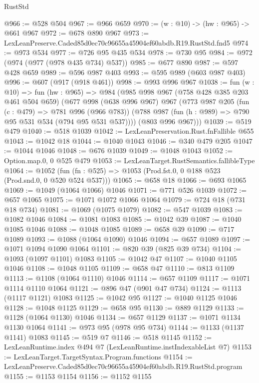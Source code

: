 \begin{lexlean}{RustStd}
\begin{coremodule}
@966 := @528 @504
@967 := @966 @659
@970 := (w : @10) -> (hw : @965) -> @661 @967
@972 := @678 @890 @967
@973 := LexLeanPreserve.Caded85d0ec70c96655a45904ef60abdb.R19.RustStd.fnd5
@974 := @973 @534
@977 := @726 @95 @435 @534
@978 := @730 @95
@984 := @972 (@974 (@977 (@978 @435 @734) @537))
@985 := @677 @890
@987 := @597 @428 @659
@989 := @596 @987 @403
@993 := @595 @989 (@603 @987 @403)
@996 := @607 (@917 (@918 @461))
@998 := @993 @996 @967
@1038 := fun (w : @10) =>
  fun (hw : @965) =>
  @984
    (@985
      @998
      @967
      (@758 @428 @385 @203 @461 @504 @659)
      (@677
        @998
        (@638 @996 @967)
        @967
        (@773
          @987
          @205
          (fun (c : @479) => @781 @996 (@966 @783))
          (@788 @987 (fun (h : @989) => @790 @95 @531 @534 (@794 @95 @531 @537))))
        (@803 @996 @967)))
@1039 := @519 @479
@1040 := @518 @1039
@1042 := LexLeanPreservation.Rust.fnFallible @655
@1043 := @1042 @18
@1044 := @1040 @1043
@1046 := @340 @479 @205
@1047 := @1044 @1046
@1048 := @676 @1039
@1049 := @1048 @1043
@1052 := Option.map.{0, 0} @525 @479
@1053 := LexLeanTarget.RustSemantics.fallibleType
@1064 := @1052
    (fun (fn : @525) => @1053 (Prod.fst.{0, 0} @188 @523 (Prod.snd.{0, 0} @520 @524 @537)))
@1065 := @658 @18
@1066 := @693 @1065
@1069 := @1049 (@1064 @1066) @1046
@1071 := @771 @526 @1039
@1072 := @657 @1065
@1075 := @1071 @1072 @1066 @1064
@1079 := @724 @18 (@731 @18 @734)
@1081 := @1069 (@1075 @1079)
@1082 := @547 @1039
@1083 := @1082 @1046
@1084 := @1081 @1083
@1085 := @1042 @39
@1087 := @1040 @1085 @1046
@1088 := @1048 @1085
@1089 := @658 @39
@1090 := @717 @1089
@1093 := @1088 (@1064 @1090) @1046
@1094 := @657 @1089
@1097 := @1071 @1094 @1090 @1064
@1101 := @820 @39 (@825 @39 @734)
@1104 := @1093 (@1097 @1101) @1083
@1105 := @1042 @47
@1107 := @1040 @1105 @1046
@1108 := @1048 @1105
@1109 := @658 @47
@1110 := @813 @1109
@1113 := @1108 (@1064 @1110) @1046
@1114 := @657 @1109
@1117 := @1071 @1114 @1110 @1064
@1121 := @896 @47 (@901 @47 @734)
@1124 := @1113 (@1117 @1121) @1083
@1125 := @1042 @95
@1127 := @1040 @1125 @1046
@1128 := @1048 @1125
@1129 := @658 @95
@1130 := @889 @1129
@1133 := @1128 (@1064 @1130) @1046
@1134 := @657 @1129
@1137 := @1071 @1134 @1130 @1064
@1141 := @973 @95 (@978 @95 @734)
@1144 := @1133 (@1137 @1141) @1083
@1145 := @519 @7
@1146 := @518 @1145
@1152 := LexLeanRuntime.index @494 @7 (LexLeanRuntime.instIndexableList @7)
@1153 := LexLeanTarget.TargetSyntax.Program.functions
@1154 := LexLeanPreserve.Caded85d0ec70c96655a45904ef60abdb.R19.RustStd.program
@1155 := @1153 @1154
@1156 := @1152 @1155

\end{coremodule}
\end{lexlean}
